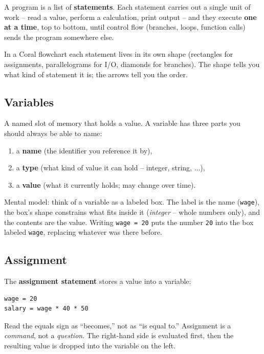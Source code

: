 \documentclass[11pt]{article}
\begin{document}
A program is a list of \textbf{statements}. Each statement carries out a
single unit of work -- read a value, perform a calculation, print output --
and they execute \textbf{one at a time}, top to bottom, until control flow
(branches, loops, function calls) sends the program somewhere else.

In a Coral flowchart each statement lives in its own shape (rectangles for
assignments, parallelograms for I/O, diamonds for branches). The shape tells
you what kind of statement it is; the arrows tell you the order.

\subsection{Variables}

\begin{defnbox}[Variable]
A named slot of memory that holds a value. A variable has three parts you
should always be able to name:
\begin{enumerate}
    \item a \textbf{name} (the identifier you reference it by),
    \item a \textbf{type} (what kind of value it can hold -- integer, string, $\ldots$),
    \item a \textbf{value} (what it currently holds; may change over time).
\end{enumerate}
\end{defnbox}

Mental model: think of a variable as a labeled box. The label is the name
(\texttt{wage}), the box's shape constrains what fits inside it (\emph{integer}
-- whole numbers only), and the contents are the value. Writing \texttt{wage = 20}
puts the number \texttt{20} into the box labeled \texttt{wage}, replacing
whatever was there before.

\subsection{Assignment}

The \textbf{assignment statement} stores a value into a variable:
\begin{lstlisting}
wage = 20
salary = wage * 40 * 50
\end{lstlisting}

Read the equals sign as ``becomes,'' not as ``is equal to.'' Assignment is a
\emph{command}, not a \emph{question}. The right-hand side is evaluated first,
then the resulting value is dropped into the variable on the left.
\end{document}
